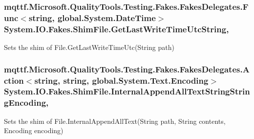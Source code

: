 \hypertarget{class_system_1_1_i_o_1_1_fakes_1_1_shim_file_a80b4e26ca996a276673aa7e22c16c58b}{
\subsubsection[{Get\-Last\-Write\-Time\-Utc\-String}]{\setlength{\rightskip}{0pt plus 5cm}mqttf.\-Microsoft.\-Quality\-Tools.\-Testing.\-Fakes.\-Fakes\-Delegates.\-Func$<$string, global.\-System.\-Date\-Time$>$ System.\-I\-O.\-Fakes.\-Shim\-File.\-Get\-Last\-Write\-Time\-Utc\-String\hspace{0.3cm}{\ttfamily [static]}, {\ttfamily [set]}}}\label{class_system_1_1_i_o_1_1_fakes_1_1_shim_file_a80b4e26ca996a276673aa7e22c16c58b}


Sets the shim of File.\-Get\-Last\-Write\-Time\-Utc(\-String path)

\hypertarget{class_system_1_1_i_o_1_1_fakes_1_1_shim_file_a38dd38155913c6ae63b2412dab1bfaa1}{
\subsubsection[{Internal\-Append\-All\-Text\-String\-String\-Encoding}]{\setlength{\rightskip}{0pt plus 5cm}mqttf.\-Microsoft.\-Quality\-Tools.\-Testing.\-Fakes.\-Fakes\-Delegates.\-Action$<$string, string, global.\-System.\-Text.\-Encoding$>$ System.\-I\-O.\-Fakes.\-Shim\-File.\-Internal\-Append\-All\-Text\-String\-String\-Encoding\hspace{0.3cm}{\ttfamily [static]}, {\ttfamily [set]}}}\label{class_system_1_1_i_o_1_1_fakes_1_1_shim_file_a38dd38155913c6ae63b2412dab1bfaa1}


Sets the shim of File.\-Internal\-Append\-All\-Text(\-String path, String contents, Encoding encoding)

